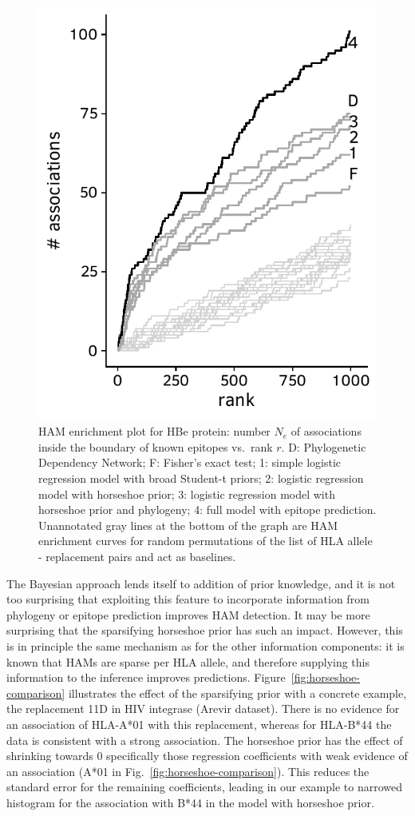 \documentclass{bioinfo}
\begin{document}
\begin{figure}
  \centering
  \includegraphics[width=0.8\linewidth]{plots/HBe.pdf}
  \caption{HAM enrichment plot for HBe protein: number $N_e$ of associations inside the boundary of known epitopes vs.\ rank $r$. D: Phylogenetic Dependency Network; F: Fisher's exact test; 1: simple logistic regression model with broad Student-t priors; 2: logistic regression model with horseshoe prior; 3: logistic regression model with horseshoe prior and phylogeny; 4: full model with epitope prediction. Unannotated gray lines at the bottom of the graph are HAM enrichment curves for random permutations of the list of HLA allele - replacement pairs and act as baselines.}
  \label{fig:comparison}
\end{figure}

The Bayesian approach lends itself to addition of prior knowledge, and it is not too surprising that exploiting this feature to incorporate information from phylogeny or epitope prediction improves HAM detection. It may be more surprising that the sparsifying horseshoe prior has such an impact. However, this is in principle the same mechanism as for the other information components: it is known that HAMs are sparse per HLA allele, and therefore supplying this information to the inference improves predictions. Figure~\ref{fig:horseshoe-comparison} illustrates the effect of the sparsifying prior with a concrete example, the replacement 11D in HIV integrase (Arevir dataset). There is no evidence for an association of HLA-A*01 with this replacement, whereas for HLA-B*44 the data is consistent with a strong association.  The horseshoe prior has the effect of shrinking towards 0 specifically those regression coefficients with weak evidence of an association (A*01 in Fig.~\ref{fig:horseshoe-comparison}). This reduces the standard error for the remaining coefficients, leading in our example to narrowed histogram for the association with B*44 in the model with horseshoe prior.
\end{document}
